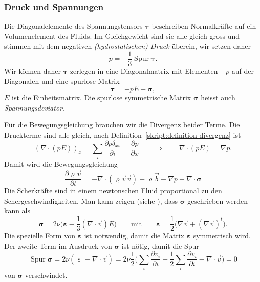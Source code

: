 \subsubsection{Druck und Spannungen}
Die Diagonalelemente des Spannungstensors $\bm{\tau}$ beschreiben
Normalkräfte auf ein Volumenelement des Fluids.
Im Gleichgewicht sind sie alle gleich gross und stimmen mit dem
negativen {\em (hydrostatischen) Druck} überein, wir setzen daher
\[
p=-\frac13\operatorname{Spur}\bm{\tau}.
\]
Wir können daher $\bm{\tau}$ zerlegen in eine Diagonalmatrix
mit Elementen $-p$ auf der Diagonalen und eine spurlose Matrix
\[
\bm{\tau} = -pE + \bm{\sigma},
\]
$E$ ist die Einheitsmatrix.
Die spurlose symmetrische Matrix $\bm{\sigma}$ heisst auch
{\em Spannungsdeviator}.

Für die Bewegungsgleichung brauchen wir die Divergenz beider Terme.
Die Druckterme sind alle gleich, nach
Definition~\ref{skript:definition divergenz} ist
\[
(\nabla\cdot(pE))_x
=
\sum_i
\frac{\partial p\delta_{xi}}{\partial i}
=
\frac{\partial p}{\partial x}
\qquad\Rightarrow\qquad
\nabla\cdot(pE)
=
\nabla p.
\]
Damit wird die Bewegungsgleichung 
\begin{equation}
\frac{\partial \varrho\vec{v}}{\partial t}
=
-\nabla\cdot(\varrho\vec{v}\vec{v})
+\varrho\vec b
-\nabla p
+\nabla\cdot\bm{\sigma}
\label{skript:navier-stokes2}
\end{equation}
Die Scherkräfte sind in einem newtonschen Fluid proportional zu
den Schergeschwindigkeiten.
Man kann zeigen (siehe \cite[p.~172]{skript:kaperengler}), dass $\bm{\sigma}$
geschrieben werden kann als
\[
\bm{\sigma}
=
2\nu\biggl(\bm{\varepsilon} - \frac13(\nabla\cdot\vec{v})E\biggr)
\qquad\text{mit}\qquad
\bm{\varepsilon}=\frac12\bigl(\nabla\vec{v}+(\nabla\vec{v})^t\bigr).
\]
Die spezielle Form von $\bm{\varepsilon}$ ist notwendig, damit die Matrix
$\bm{\varepsilon}$ symmetrisch wird.
Der zweite Term im Ausdruck von $\bm{\sigma}$ ist nötig, damit die Spur
\[
\operatorname{Spur}{\bm{\sigma}}
=
2\nu(\operatorname{\varepsilon} - \nabla\cdot\vec{v})
=
2\nu
\frac12
\biggl(
\sum_i \frac{\partial v_i}{\partial i}
+
\frac12
\sum_i \frac{\partial v_i}{\partial i}
-
\nabla\cdot\vec{v}
\biggr)
=
0
\]
von $\bm{\sigma}$ verschwindet.

